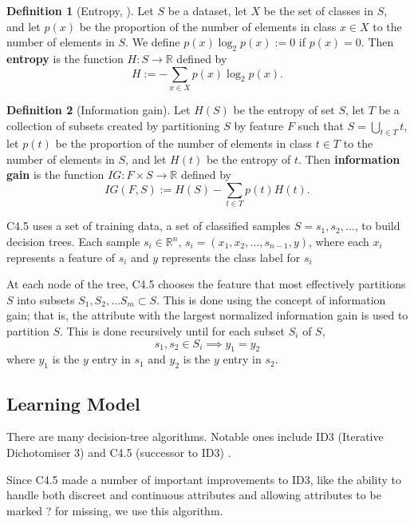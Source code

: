 \documentclass[12pt]{amsproc}
\newcommand\R{{\mathbb R}}
\theoremstyle{definition}
\newtheorem{definition}{Definition}
\begin{document}
	\begin{definition}[Entropy, \cite{shannon}]
		Let $S$ be a dataset, let $X$ be the set of classes in $S$, and let $p(x)$ be the proportion of the number of elements in class $x \in X$ to the number of elements in $S$. We define $p(x) \log_2 p(x) := 0$ if $p(x) = 0$. Then \textbf{entropy} is the function $H:S \to \R$ defined by 
		$$H := -\sum_{x \in X} p(x) \log_2 p(x).$$
	\end{definition}
	
	\begin{definition}[Information gain]
		Let $H(S)$ be the entropy of set $S$, let $T$ be a collection of subsets created by partitioning $S$ by feature $F$ such that $S = \bigcup_{t \in T}t$, let $p(t)$ be the proportion of the number of elements in class $t \in T$ to the number of elements in $S$, and let $H(t)$ be the entropy of $t$. 
		Then \textbf{information gain} is the function $IG: F \times S \to \R$ defined by 
		$$IG(F, S) := H(S) - \sum_{t \in T} p(t) H(t).$$
	\end{definition}
	
	C4.5 uses a set of training data, a set of classified samples $S = s_1,s_2,\ldots$, to build decision trees. Each sample $s_i \in \R^n$, $s_i = (x_1,x_2,\ldots,s_{n-1}, y)$, where each $x_i$ represents a feature of $s_i$ and $y$ represents the class label for $s_i$ 
	
	At each node of the tree, C4.5 chooses the feature that most effectively partitions $S$ into subsets $S_1, S_2, \ldots S_m \subset S$. This is done using the concept of information gain; that is, the attribute with the largest normalized information gain is used to partition $S$. This is done recursively until for each subset $S_i$ of $S$, $$s_1, s_2 \in S_i \implies y_1 = y_2$$
	where $y_1$ is the $y$ entry in $s_1$ and $y_2$ is the $y$ entry in $s_2$.

	\subsection{Learning Model}\label{implementation:learning model}
	
	There are many decision-tree algorithms. Notable ones include ID3 (Iterative Dichotomiser 3) and C4.5 (successor to ID3) \cite{wikipedia:decision_tree}. 
	
	Since C4.5 made a number of important improvements to ID3, like the ability to handle both discreet and continuous attributes and allowing attributes to be marked ? for missing, we use this algorithm.
	
\end{document}
